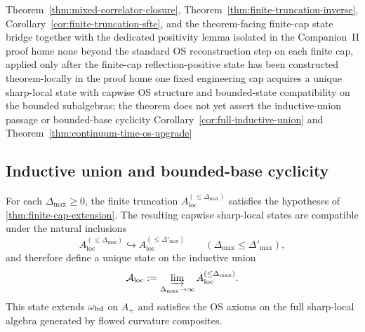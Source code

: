 \dependencyledger
  {Theorem~\ref{thm:mixed-correlator-closure}, Theorem~\ref{thm:finite-truncation-inverse}, Corollary~\ref{cor:finite-truncation-sfte}, and the theorem-facing finite-cap state bridge together with the dedicated positivity lemma isolated in the Companion~II proof home}
  {none beyond the standard OS reconstruction step on each finite cap, applied only after the finite-cap reflection-positive state has been constructed theorem-locally in the proof home}
  {one fixed engineering cap acquires a unique sharp-local state with capwise OS structure and bounded-state compatibility on the bounded subalgebras; the theorem does not yet assert the inductive-union passage or bounded-base cyclicity}
  {Corollary~\ref{cor:full-inductive-union} and Theorem~\ref{thm:continuum-time-os-upgrade}}

\subsection{Inductive union and bounded-base cyclicity}

\begin{corollary}\label{cor:full-inductive-union}
For each $\Delta_{\max}\ge 0$, the finite truncation $A_{\mathrm{loc}}^{(\le \Delta_{\max})}$ satisfies the hypotheses of \cref{thm:finite-cap-extension}. The resulting capwise sharp-local states are compatible under the natural inclusions
\[
A_{\mathrm{loc}}^{(\le \Delta_{\max})}\hookrightarrow A_{\mathrm{loc}}^{(\le \Delta'_{\max})}
\qquad (\Delta_{\max}\le \Delta'_{\max}),
\]
and therefore define a unique state on the inductive union
\[
\mathcal{A}_{\mathrm{loc}}:=\varinjlim_{\Delta_{\max}\to\infty} A_{\mathrm{loc}}^{(\le \Delta_{\max})}.
\]
This state extends $\omega_{\mathrm{bd}}$ on $A_+$ and satisfies the OS axioms on the full sharp-local algebra generated by flowed curvature composites.
\end{corollary}

